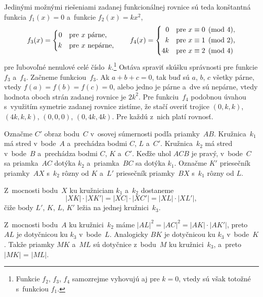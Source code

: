 {Jedinými možnými riešeniami zadanej funkcionálnej rovnice sú teda konštantná funkcia $f_1(x)=0$  a~funkcie $f_2(x)=kx^2$,
$$
f_3(x)=\left\{
\aligned
0&\quad\text{pre $x$ párne,}\\
k&\quad\text{pre $x$ nepárne,}
\endaligned
\right.\qquad
f_4(x)=\left\{
\aligned
0&\quad\text{pre $x\equiv 0\pmod 4$,}\\
k&\quad\text{pre $x\equiv 1\pmod 2$,}\\
4k&\quad\text{pre $x\equiv 2\pmod 4$}
\endaligned
\right.
$$
pre ľubovoľné nenulové celé číslo~$k$.\footnote{Funkcie $f_2$, $f_3$, $f_4$ samozrejme vyhovujú aj pre $k=0$, vtedy sú však totožné s~funkciou $f_1$.} Ostáva spraviť skúšku správnosti pre funkcie $f_3$ a~$f_4$. Začneme funkciou~$f_3$. Ak $a+b+c=0$, tak buď sú $a$, $b$, $c$ všetky párne, vtedy $f(a)=f(b)=f(c)=0$, alebo jedno je párne a~dve sú nepárne, vtedy hodnota oboch strán zadanej rovnice je $2k^2$. Pre funkciu~$f_4$ podobnou úvahou s~využitím symetrie zadanej rovnice zistíme, že stačí overiť trojice $(0, k, k)$, $(4k, k, k)$, $(0,0,0)$, $(0,4k, 4k)$. Pre každú z~nich platí rovnosť.
}

{%
Označme $C'$ obraz bodu~$C$ v~osovej súmernosti podľa priamky~$AB$. Kružnica~$k_1$ má stred v~bode~$A$ a~prechádza bodmi $C$, $L$ a~$C'$.
Kružnica~$k_2$ má stred v~bode~$B$ a~prechádza bodmi $C$, $K$ a~$C'$. Keďže uhol $ACB$ je pravý, v~bode~$C$ sa priamka~$AC$ dotýka $k_2$ a~priamka~$BC$ sa dotýka $k_1$.
Označme $K'$ priesečník priamky~$AX$ s~$k_2$ rôzny od $K$ a~$L'$ priesečník priamky~$BX$ s~$k_1$ rôzny od $L$.

Z~mocnosti bodu~$X$ ku kružniciam $k_1$ a~$k_2$ dostaneme
$$
|XK|\cdot |XK'| = |XC|\cdot |XC'| = |XL|\cdot |XL'|,
$$
čiže body $L'$, $K$, $L$, $K'$ ležia na jednej kružnici~$k_3$.
%

Z~mocnosti bodu~$A$ ku kružnici~$k_2$ máme $|AL|^2 = |AC|^2 = |AK|\cdot |AK'|$, preto $AL$ je dotyčnicou ku $k_3$ v~bode~$L$.
Analogicky $BK$ je dotyčnicou ku $k_3$ v~bode~$K$.
Takže priamky $MK$ a~$ML$ sú dotyčnice z~bodu~$M$ ku kružnici~$k_3$, a~preto $|MK|$ = $|ML|$.
}

